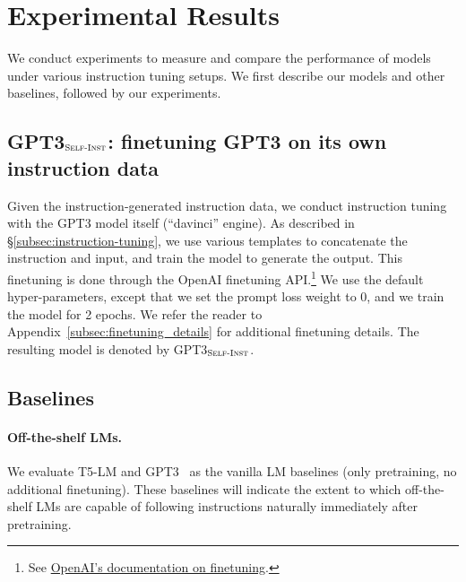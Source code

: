 \documentclass[11pt]{article}
\newcommand{\gptthree}{\textsc{GPT3}}
\newcommand{\gptself}{\textsc{GPT3}$_{\textsc{Self-Inst}}$}
\begin{document}



\label{subsec:quality}



\section{Experimental Results}
\label{sec:experiment_results}

We conduct experiments to measure and compare the performance of models under various instruction tuning setups. 
We first describe our models and other baselines, followed by our experiments. 

\subsection{\gptself{}: finetuning \gptthree{} on its own instruction data}
\label{subsec:self-instruct-gpt3}
Given the instruction-generated instruction data, we conduct instruction tuning with the \gptthree{} model itself (``davinci'' engine). As described in \S\ref{subsec:instruction-tuning}, we use various templates to concatenate the instruction and input, and train the model to generate the output. This finetuning is done through the OpenAI finetuning API.\footnote{See \href{https://beta.openai.com/docs/guides/fine-tuning}{OpenAI's documentation on finetuning}.
} We use the default hyper-parameters, except that we set the prompt loss weight to 0, and we train the model for 2 epochs. We refer the reader to Appendix~\ref{subsec:finetuning_details} for additional finetuning details. The resulting model is denoted by \gptself{}.



\subsection{Baselines}
\paragraph{Off-the-shelf LMs.} 
We evaluate T5-LM \cite{lester2021power,raffel2020exploring} and \gptthree{}~\cite{brown2020gpt3} as the vanilla LM baselines (only pretraining, no additional finetuning). 
These baselines will indicate the extent to which off-the-shelf LMs are capable of following instructions naturally immediately after pretraining.
\end{document}
